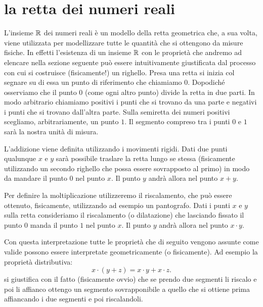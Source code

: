 \section{la retta dei numeri reali}
\label{sec:reali}

L'insieme $\mathbb R$ dei numeri reali è un modello della retta geometrica che,
a sua volta, viene utilizzata per modellizzare tutte le quantità che si ottengono
da misure fisiche.
In effetti l'esistenza di un insieme $\mathbb R$ con le proprietà
che andremo ad elencare nella sezione seguente
può essere intuitivamente giustificata dal processo con cui
si costruisce (fisicamente!) un righello. Presa una retta si inizia col segnare
su di essa un punto di riferimento che chiamiamo $0$. Dopodiché osserviamo che
il punto $0$ (come ogni altro punto) divide la retta in due parti. In modo arbitrario
chiamiamo positivi i punti che si trovano da una parte e negativi i punti che
si trovano dall'altra parte. Sulla semiretta dei numeri positivi scegliamo, arbitrariamente,
un punto $1$. Il segmento compreso tra i punti $0$ e $1$ sarà la nostra unità di
misura.

L'addizione viene definita utilizzando i movimenti rigidi.
Dati due punti qualunque $x$ e $y$ sarà possibile
traslare la retta lungo se stessa
(fisicamente utilizzando un secondo righello che possa essere sovrapposto al primo)
in modo da mandare il punto $0$ nel punto $x$. Il punto $y$ andrà allora nel
punto $x+y$.

Per definire la moltiplicazione utilizzeremo il riscalamento, che può
essere ottenuto, fisicamente, utilizzando ad esempio un pantografo.
Dati i punti $x$ e $y$ sulla retta consideriamo il riscalamento (o dilatazione)
che lasciando fissato il punto $0$ manda il punto $1$ nel punto $x$. Il punto $y$
andrà allora nel punto $x\cdot y$.

Con questa interpretazione tutte le proprietà che di seguito vengono assunte come
valide possono essere interpretate geometricamente (o fisicamente).
Ad esempio la proprietà distributiva:
\[
  x \cdot (y +z) = x \cdot y + x \cdot z.
\]
si giustifica con il fatto (fisicamente ovvio) che se prendo due segmenti
li riscalo e poi li affianco ottengo un segmento sovrapponibile a quello che
si ottiene prima affiancando i due segmenti e poi riscalandoli.

